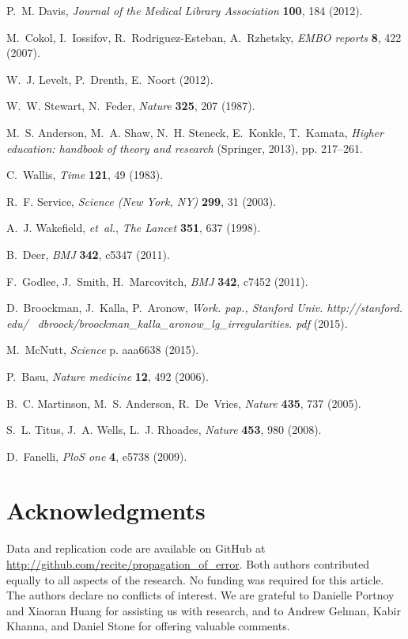 \documentclass[12pt]{article}
\begin{document}
\begin{thebibliography}{10}
P.~M. Davis, {\it Journal of the Medical Library Association\/} {\bf 100}, 184
  (2012).

M.~Cokol, I.~Iossifov, R.~Rodriguez-Esteban, A.~Rzhetsky, {\it EMBO reports\/}
  {\bf 8}, 422 (2007).

W.~J. Levelt, P.~Drenth, E.~Noort  (2012).

W.~W. Stewart, N.~Feder, {\it Nature\/} {\bf 325}, 207 (1987).

M.~S. Anderson, M.~A. Shaw, N.~H. Steneck, E.~Konkle, T.~Kamata, {\it Higher
  education: handbook of theory and research\/} (Springer, 2013), pp. 217--261.

C.~Wallis, {\it Time\/} {\bf 121}, 49 (1983).

R.~F. Service, {\it Science (New York, NY)\/} {\bf 299}, 31 (2003).

A.~J. Wakefield, {\it et~al.\/}, {\it The Lancet\/} {\bf 351}, 637 (1998).

B.~Deer, {\it BMJ\/} {\bf 342}, c5347 (2011).

F.~Godlee, J.~Smith, H.~Marcovitch, {\it BMJ\/} {\bf 342}, c7452 (2011).

D.~Broockman, J.~Kalla, P.~Aronow, {\it Work. pap., Stanford Univ.
  http://stanford. edu/~ dbroock/broockman\_kalla\_aronow\_lg\_irregularities.
  pdf\/}  (2015).

M.~McNutt, {\it Science\/} p. aaa6638 (2015).

P.~Basu, {\it Nature medicine\/} {\bf 12}, 492 (2006).

B.~C. Martinson, M.~S. Anderson, R.~De~Vries, {\it Nature\/} {\bf 435}, 737
  (2005).

S.~L. Titus, J.~A. Wells, L.~J. Rhoades, {\it Nature\/} {\bf 453}, 980 (2008).

D.~Fanelli, {\it PloS one\/} {\bf 4}, e5738 (2009).

\end{thebibliography}


\clearpage

\section*{Acknowledgments}
Data and replication code are available on GitHub at \href{http://github.com/recite/propagation\_of\_error}{http://github.com/recite/propagation\_of\_error}. Both authors contributed equally to all aspects of the research. No funding was required for this article. The authors declare no conflicts of interest. We are grateful to Danielle Portnoy and Xiaoran Huang for assisting us with research, and to Andrew Gelman, Kabir Khanna, and Daniel Stone for offering valuable comments.
\end{document}
